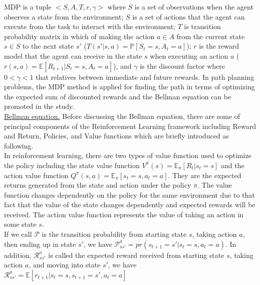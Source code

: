 \noindent MDP is a tuple $<S,A,T,r,\gamma>$ where $S$ is a set of observations when the agent observes a state from the environment; $S$ is a set of actions that the agent can execute from the task to interact with the environment; $T$ is transition probability matrix in which of making the action $a \in A$ from the current state $s \in S$ to the next state $s'$ ($T(s'|s,a)=\mathbb{P}[S_t=s, A_t=a]$); $r$ is the reward model that the agent can receive in the state $s$ when executing an action $a$ ($r(s,a)=\mathbb{E}[R_{t+1}|S_t=s, A_t=a]$), and $\gamma$ is the discount factor where $0<\gamma<1$ that relatives between immediate and future rewards. In path planning problems, the MDP method is applied for finding the path in terms of optimizing the expected sum of discounted rewards and the Bellman equation \cite{Bellman57_MDP} can be promoted in the study.\\ 



\noindent\uline{Bellman equation.} Before discussing the Bellman equation, there are some of principal components of the Reinforcement Learning framework including Reward and Return, Policies, and Value functions which are briefly introduced as following. \\
\noindent In reinforcement learning, there are two types of value function used to optimize the policy including the state value function $
V^{\pi}(s)=\mathbb{E}_{\pi}[R_t|s_t=s]
$ and the action value function $
Q^{\pi}(s,a)=\mathbb{E}_{\pi}[s_t=s,a_t=a]
$. They are the expected returns generated from the state and action under the policy $\pi$.
The value function changes dependently on the policy for the same environment due to that fact that the value of the state changes dependently and expected rewards will be received. The action value function represents the value of taking an action in some state $s$.\\

\noindent If we call $\mathcal{P}$ is the transition probability from starting state $s$, taking action $a$, then ending up in state $s'$, we have 
$
\mathcal{P}^a_{ss'}=pr(s_{t+1}=s'|s_t=s,a_t=a)
$. 
In addition, $\mathcal{R}^a_{ss'}$ is called the expected reward received from starting state $s$, taking action $a$, and moving into state $s'$, we have 
$
\mathcal{R}^a_{ss'}=\mathbb{E}[r_{t+1}|s_t=s,s_{t+1}=s',a_t=a]
$

